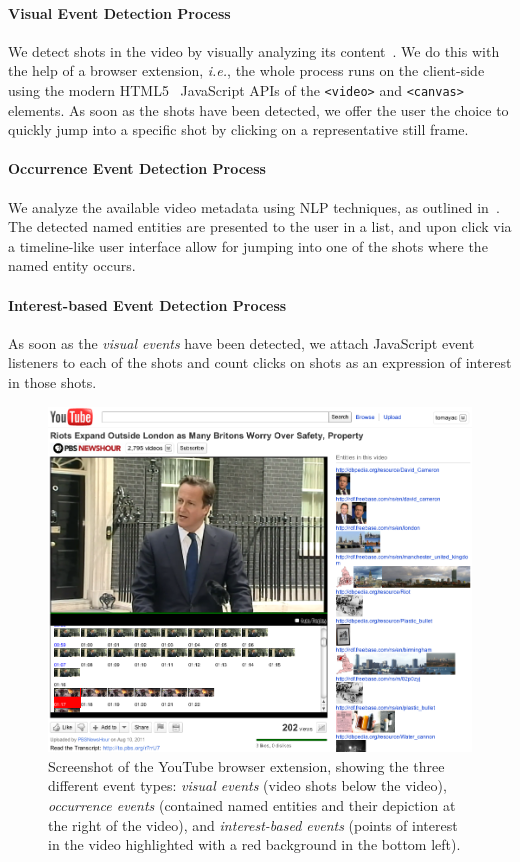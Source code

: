 \documentclass[runningheads,a4paper]{llncs}
\begin{document}
\paragraph{Visual Event Detection Process}
We detect shots in the video by visually analyzing its content~\cite{artemis}. We do this with the help of a browser extension, \emph{i.e.}, the whole process runs on the client-side using the modern HTML5~\cite{w3c_html5} JavaScript APIs of the \texttt{<video>} and \texttt{<canvas>} elements. As soon as the shots have been detected, we offer the user the choice to quickly jump into a specific shot by clicking on a representative still frame. 

\paragraph{Occurrence Event Detection Process}
We analyze the available video metadata using NLP techniques, as outlined in~\cite{semwebvid}. The detected named entities are presented to the user in a list, and upon click via a timeline-like user interface allow for jumping into one of the shots where the named entity occurs.

\paragraph{Interest-based Event Detection Process} As soon as the \emph{visual events} have been detected, we attach JavaScript event listeners to each of the shots and count clicks on shots as an expression of interest in those shots.

\begin{figure}[h]
\begin{center}
   \includegraphics[width=0.9\linewidth]{./resources/youtube}
\end{center}
   \caption{Screenshot of the YouTube browser extension, showing the three different event types: \emph{visual events} (video shots below the video), \emph{occurrence events} (contained named entities and their depiction at the right of the video), and \emph{interest-based events} (points of interest in the video highlighted with a red background in the bottom left).}
\label{fig:youtube}
\end{figure}
\end{document}
